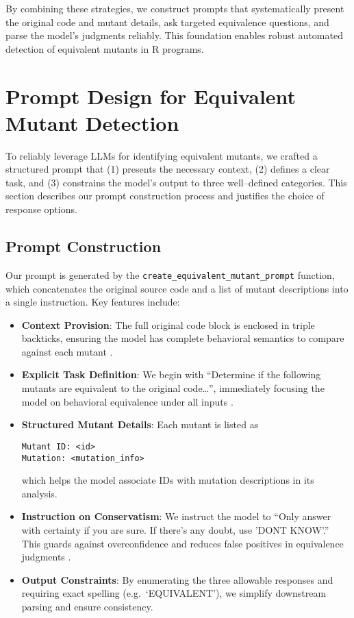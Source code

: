 By combining these strategies, we construct prompts that systematically present the original code and mutant details, ask targeted equivalence questions, and parse the model’s judgments reliably. This foundation enables robust automated detection of equivalent mutants in R programs.  

\section{Prompt Design for Equivalent Mutant Detection}

To reliably leverage LLMs for identifying equivalent mutants, we crafted a structured prompt that (1) presents the necessary context, (2) defines a clear task, and (3) constrains the model’s output to three well–defined categories.  This section describes our prompt construction process and justifies the choice of response options.

\subsection{Prompt Construction}

Our prompt is generated by the \texttt{create\_equivalent\_mutant\_prompt} function, which concatenates the original source code and a list of mutant descriptions into a single instruction.  Key features include:
\begin{itemize}
  \item \textbf{Context Provision}: The full original code block is enclosed in triple backticks, ensuring the model has complete behavioral semantics to compare against each mutant \cite{openai2023api}.
  \item \textbf{Explicit Task Definition}: We begin with “Determine if the following mutants are equivalent to the original code…”, immediately focusing the model on behavioral equivalence under all inputs \cite{liu2021pre}.
  \item \textbf{Structured Mutant Details}: Each mutant is listed as
  \begin{verbatim}
Mutant ID: <id>
Mutation: <mutation_info>
  \end{verbatim}
  which helps the model associate IDs with mutation descriptions in its analysis.
  \item \textbf{Instruction on Conservatism}: We instruct the model to “Only answer with certainty if you are sure. If there's any doubt, use 'DONT KNOW'.”  This guards against overconfidence and reduces false positives in equivalence judgments \cite{wei2022chain}.
  \item \textbf{Output Constraints}: By enumerating the three allowable responses and requiring exact spelling (e.g.\ ‘EQUIVALENT’), we simplify downstream parsing and ensure consistency.
\end{itemize}

